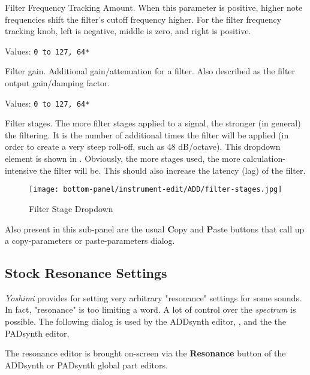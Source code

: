    Filter Frequency Tracking Amount.
   When this parameter is positive, higher note
   frequencies shift the filter’s cutoff frequency higher.
   For the filter frequency tracking knob, left is negative, middle is
   zero, and right is positive.

   Values: \texttt{0 to 127, 64*}

   Filter gain.
   Additional gain/attenuation for a filter.
   Also described as the filter output gain/damping factor.

   Values: \texttt{0 to 127, 64*}

   Filter stages.
   The more filter stages applied to a signal, the stronger (in general) the
   filtering.
   It is the number of additional times the filter will be applied (in
   order to create a very steep roll-off, such as 48 dB/octave).
   This dropdown
   element is shown in
   .
   Obviously, the more stages used, the more calculation-intensive the
   filter will be.  This should also increase the latency (lag) of the
   filter.

\begin{figure}[H]
   \centering 
   \texttt{[image: bottom-panel/instrument-edit/ADD/filter-stages.jpg]}
   \caption[Filter Stage Dropdown]{Filter Stage Dropdown}
   \label{fig:filter_stage_dropdown} 
\end{figure}

   Also present in this sub-panel are the usual \textbf{C}opy
   and \textbf{P}aste buttons that call up a copy-parameters or
   paste-parameters dialog.

\subsection{Stock Resonance Settings}
\label{subsec:stock_resonance_settings}

   \textsl{Yoshimi} provides for setting very arbitrary "resonance"
   settings for some sounds.  In fact, "resonance" is too limiting a word.
   A lot of control over the \textsl{spectrum} is possible.
   The following dialog is used by
   the ADDsynth editor,
   , and the
   the PADsynth editor,

   The resonance editor is brought on-screen via the
   \textbf{Resonance} button of the ADDsynth or PADsynth
   global part editors.

